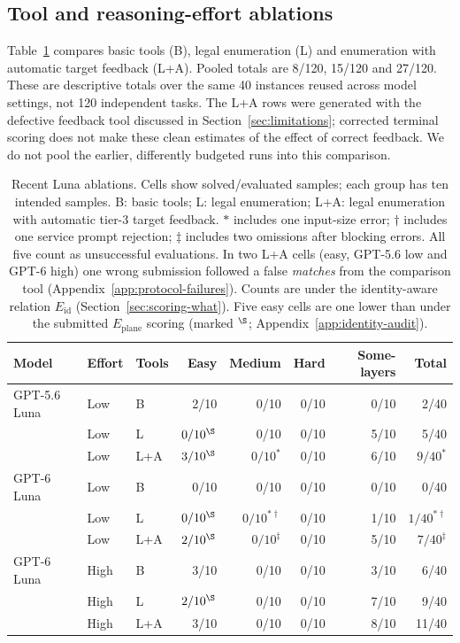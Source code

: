 \subsection{Tool and reasoning-effort ablations}
\label{sec:results-tiers}\label{sec:results-ablations}
Table~\ref{tab:luna-ablations} compares basic tools (B), legal enumeration (L) and
enumeration with automatic target feedback (L+A). Pooled totals are 8/120, 15/120 and
27/120. These are descriptive totals over the same 40 instances reused across model
settings, not 120 independent tasks. The L+A rows were generated with the defective
feedback tool discussed in Section~\ref{sec:limitations}; corrected terminal scoring
does not make these clean estimates of the effect of correct feedback. We do not pool
the earlier, differently budgeted runs into this comparison.
\begin{table}[htbp]
\centering
\caption{Recent Luna ablations. Cells show solved/evaluated samples; each group
has ten intended samples. B: basic tools; L: legal enumeration; L+A: legal enumeration
with automatic tier-3 target feedback. $*$ includes one input-size error;
$\dagger$ includes one service prompt rejection; $\ddagger$ includes two
omissions after blocking errors. All five count as unsuccessful evaluations. In two L+A cells
(easy, GPT-5.6 low and GPT-6 high) one wrong submission followed a false \emph{matches} from the
comparison tool (Appendix~\ref{app:protocol-failures}). Counts are under the identity-aware
relation $E_{\mathrm{id}}$ (Section~\ref{sec:scoring-what}). Five easy cells are one lower than
under the submitted $E_{\mathrm{plane}}$ scoring (marked $^{\S}$; Appendix~\ref{app:identity-audit}).}
\label{tab:luna-ablations}
\small
\setlength{\tabcolsep}{4pt}
\begin{tabular}{lllrrrrr}
\hline
Model & Effort & Tools & Easy & Medium & Hard & Some-layers & Total \\
\hline
GPT-5.6 Luna & Low & B & 2/10 & 0/10 & 0/10 & 0/10 & 2/40 \\
 & Low & L & $0/10^{\S}$ & 0/10 & 0/10 & 5/10 & 5/40 \\
 & Low & L+A & $3/10^{\S}$ & $0/10^{*}$ & 0/10 & 6/10 & $9/40^{*}$ \\
\hline
GPT-6 Luna & Low & B & 0/10 & 0/10 & 0/10 & 0/10 & 0/40 \\
 & Low & L & $0/10^{\S}$ & $0/10^{*\dagger}$ & 0/10 & 1/10 & $1/40^{*\dagger}$ \\
 & Low & L+A & $2/10^{\S}$ & $0/10^{\ddagger}$ & 0/10 & 5/10 & $7/40^{\ddagger}$ \\
\hline
GPT-6 Luna & High & B & 3/10 & 0/10 & 0/10 & 3/10 & 6/40 \\
 & High & L & $2/10^{\S}$ & 0/10 & 0/10 & 7/10 & 9/40 \\
 & High & L+A & 3/10 & 0/10 & 0/10 & 8/10 & 11/40 \\
\hline
\end{tabular}
\end{table}
